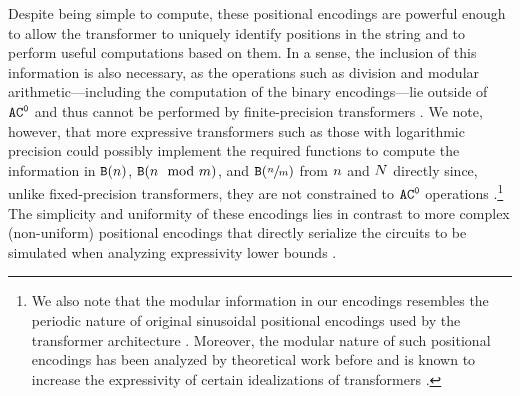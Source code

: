 Despite being simple to compute, these positional encodings are powerful enough to allow the transformer to uniquely identify positions in the string and to perform useful computations based on them.
In a sense, the inclusion of this information is also necessary, as the operations such as division and modular arithmetic---including the computation of the binary encodings---lie outside of ${{{{{{\mathtt{AC}}}^{\mathtt{0}}}}}}$ and thus cannot be performed by finite-precision transformers \citep{li2024chain}.
We note, however, that more expressive transformers such as those with logarithmic precision could possibly implement the required functions to compute the information in $\binEnc{\stridx}$, $\binEnc{\stridx \mod m}$, and $\binEnc{\sfrac{\stridx}{m}}$ from ${{n}}$ and ${{N}}$ directly since, unlike fixed-precision transformers, they are not constrained to ${{{{{{\mathtt{AC}}}^{\mathtt{0}}}}}}$ operations \citep{li2024chain}.\footnote{We also note that the modular information in our encodings resembles the periodic nature of original sinusoidal positional encodings used by the transformer architecture \citep{NIPS2017_3f5ee243}. Moreover, the modular nature of such positional encodings has been analyzed by theoretical work before and is known to increase the expressivity of certain idealizations of transformers \citep{li2025characterizingexpressivitytransformerlanguage,jerad2025uniquehardattentiontale}.}
The simplicity and uniformity of these encodings lies in contrast to more complex (non-uniform) positional encodings that directly serialize the circuits to be simulated when analyzing expressivity lower bounds \citep{li2024chain,saunshi2025reasoninglatentthoughtspower,london2025pausetokensstrictlyincrease}.

